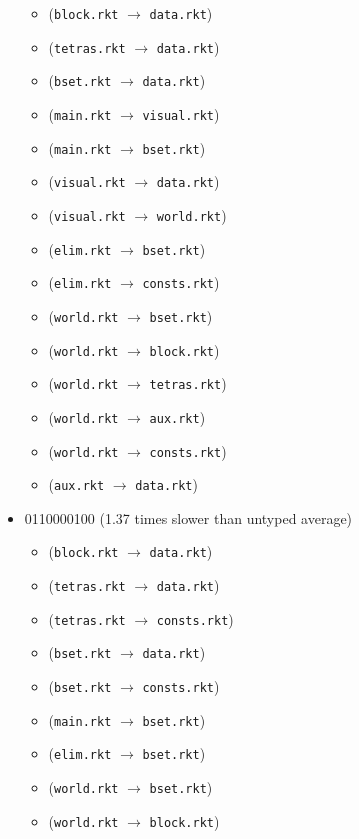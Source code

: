 \documentclass{article}
\newcommand{\mono}[1]{\texttt{#1}}
\begin{document}
\begin{itemize}
  \begin{itemize}
  \item (\mono{block.rkt} $\rightarrow$ \mono{data.rkt})
  \item (\mono{tetras.rkt} $\rightarrow$ \mono{data.rkt})
  \item (\mono{bset.rkt} $\rightarrow$ \mono{data.rkt})
  \item (\mono{main.rkt} $\rightarrow$ \mono{visual.rkt})
  \item (\mono{main.rkt} $\rightarrow$ \mono{bset.rkt})
  \item (\mono{visual.rkt} $\rightarrow$ \mono{data.rkt})
  \item (\mono{visual.rkt} $\rightarrow$ \mono{world.rkt})
  \item (\mono{elim.rkt} $\rightarrow$ \mono{bset.rkt})
  \item (\mono{elim.rkt} $\rightarrow$ \mono{consts.rkt})
  \item (\mono{world.rkt} $\rightarrow$ \mono{bset.rkt})
  \item (\mono{world.rkt} $\rightarrow$ \mono{block.rkt})
  \item (\mono{world.rkt} $\rightarrow$ \mono{tetras.rkt})
  \item (\mono{world.rkt} $\rightarrow$ \mono{aux.rkt})
  \item (\mono{world.rkt} $\rightarrow$ \mono{consts.rkt})
  \item (\mono{aux.rkt} $\rightarrow$ \mono{data.rkt})
  \end{itemize}
\item 0110000100 (1.37 times slower than untyped average)
  \begin{itemize}
  \item (\mono{block.rkt} $\rightarrow$ \mono{data.rkt})
  \item (\mono{tetras.rkt} $\rightarrow$ \mono{data.rkt})
  \item (\mono{tetras.rkt} $\rightarrow$ \mono{consts.rkt})
  \item (\mono{bset.rkt} $\rightarrow$ \mono{data.rkt})
  \item (\mono{bset.rkt} $\rightarrow$ \mono{consts.rkt})
  \item (\mono{main.rkt} $\rightarrow$ \mono{bset.rkt})
  \item (\mono{elim.rkt} $\rightarrow$ \mono{bset.rkt})
  \item (\mono{world.rkt} $\rightarrow$ \mono{bset.rkt})
  \item (\mono{world.rkt} $\rightarrow$ \mono{block.rkt})

\end{itemize}
\end{itemize}
\end{document}
